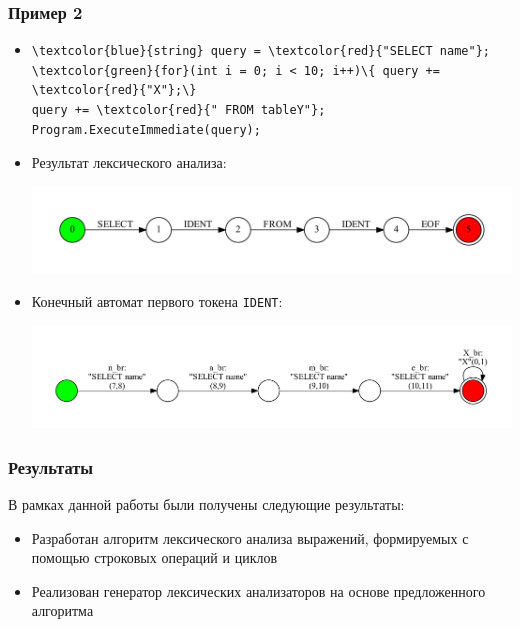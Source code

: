 \documentclass{beamer}
\begin{document}
\begin{frame}[fragile]
\transwipe[direction=90]
\frametitle{Пример 2}
\begin{itemize}
\item \begin{Verbatim}[commandchars=\\\{\}]
\textcolor{blue}{string} query = \textcolor{red}{"SELECT name"};
\textcolor{green}{for}(int i = 0; i < 10; i++)\{ query += \textcolor{red}{"X"};\} 
query += \textcolor{red}{" FROM tableY"};
Program.ExecuteImmediate(query);
\end{Verbatim}

\item Результат лексического анализа: 
\begin{center}
   \includegraphics[width=1.0\linewidth]{TokenEx}
\end{center}

\item Конечный автомат первого токена \verb|IDENT|:
\begin{center}
   \includegraphics[width=1.0\linewidth]{token}
\end{center}
\end{itemize}
\end{frame}


\begin{frame}[fragile]
\transwipe[direction=90]
\frametitle{Результаты}
В рамках данной работы были получены следующие результаты:
\begin{itemize}
\item Разработан алгоритм лексического анализа выражений, формируемых с помощью строковых операций и циклов
\item Реализован генератор лексических анализаторов на основе предложенного алгоритма
\end{itemize}
\end{frame}
\end{document}
